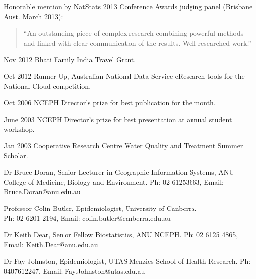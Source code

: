 \documentclass[a4paper,11pt]{article}
\begin{document}
\renewcommand{\labelenumi}{\textsc{n}\theenumi.}
\medskip  
\begin{revnumerate}
\item Honorable mention by NatStats 2013 Conference Awards judging panel (Brisbane Aust. March 2013):

\begin{quote}
“An outstanding piece of complex research combining powerful methods and linked with clear communication of the results. Well researched work.”
\end{quote}

\item Nov 2012 Bhati Family India Travel Grant.

\item Oct 2012 Runner Up, Australian National Data Service eResearch tools for the National Cloud competition.

\item Oct 2006 NCEPH Director’s prize for best publication for the month.

\item June 2003 NCEPH Director’s prize for best presentation at annual student workshop.

\item Jan 2003 Cooperative Research Centre Water Quality and Treatment Summer Scholar.
\end{revnumerate}



\renewcommand{\labelenumi}{\textsc{o}\theenumi.}
\begin{revnumerate}
\item Dr Bruce Doran, Senior Lecturer in Geographic Information Systems, ANU College of Medicine, Biology and Environment. Ph: 02 61253663, Email: Bruce.Doran@anu.edu.au

\item Professor Colin Butler, Epidemiologist, University of Canberra. \\ 
Ph: 02 6201 2194, Email: colin.butler@canberra.edu.au

\item Dr Keith Dear, Senior Fellow Biostatistics, ANU NCEPH.  Ph: 02 6125 4865, Email: Keith.Dear@anu.edu.au

\item Dr Fay Johnston, Epidemiologist, UTAS Menzies School of Health Research. Ph: 0407612247, Email: Fay.Johnston@utas.edu.au
\end{revnumerate}
\end{document}

